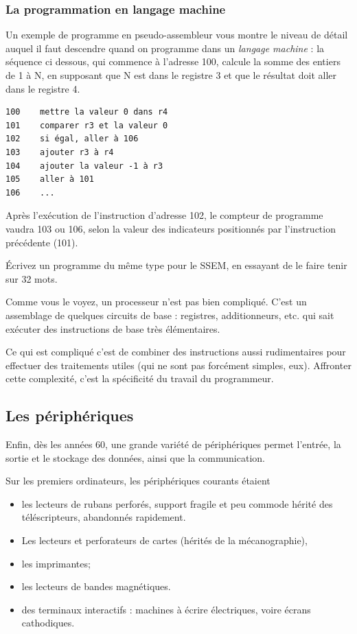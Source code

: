 \begin{multicols}{2}
\subsubsection{La programmation en langage machine}

Un exemple de programme en pseudo-assembleur  vous montre
le niveau de détail auquel il faut descendre quand on programme
dans un \emph{langage machine} : la séquence ci dessous, 
qui commence à l'adresse 100, 
calcule la somme des entiers de 1 à N, en supposant que N est dans le registre 3
et que le résultat doit aller dans le registre 4. 
\begin{verbatim}
100	   mettre la valeur 0 dans r4 
101	   comparer r3 et la valeur 0
102	   si égal, aller à 106
103	   ajouter r3 à r4
104	   ajouter la valeur -1 à r3
105	   aller à 101
106    ...
\end{verbatim}

Après l'exécution de l'instruction d'adresse 102, le compteur de programme
vaudra 103 ou 106, selon la valeur des indicateurs 
positionnés par l'instruction précédente (101).

\begin{exercice}
Écrivez un programme du même type pour le SSEM, en essayant de le
faire tenir sur 32 mots.
\end{exercice}

Comme vous le voyez, un processeur n'est pas bien compliqué. C'est un
assemblage de quelques circuits de base : registres, additionneurs,
etc. qui sait exécuter des instructions de base très élémentaires.

Ce qui est compliqué c'est de combiner des instructions aussi
rudimentaires pour effectuer des traitements utiles (qui ne sont pas
forcément simples, eux). Affronter cette complexité, c'est la
spécificité du travail du programmeur.

\subsection{Les périphériques}

Enfin, dès les années 60, une grande variété de périphériques permet
l'entrée, la sortie et le stockage des données, ainsi que la
communication.

Sur les premiers ordinateurs, les périphériques courants étaient
\begin{itemize}
\item les lecteurs de rubans perforés, support fragile et peu commode
  hérité des téléscripteurs, abandonnés rapidement.
\item Les lecteurs et perforateurs de cartes (hérités de la mécanographie),
\item les imprimantes;
\item les lecteurs de bandes magnétiques. 
\item des terminaux interactifs : machines à écrire électriques, voire
  écrans cathodiques.
\end{itemize}


\end{multicols}
